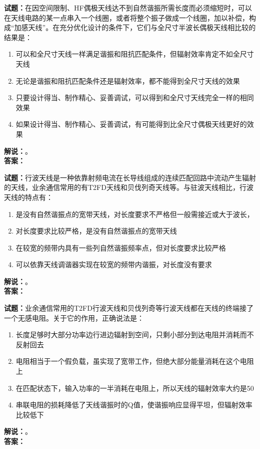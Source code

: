 \documentclass{ctexbook}
\begin{document}
\noindent\textbf{试题：}在因空间限制、HF偶极天线达不到自然谐振所需长度而必须缩短时，可以在天线电路的某一点串入一个线圈，或者将整个振子做成一个线圈，加以补偿，构成“加感天线”。在充分优化设计的条件下，它们与全尺寸半波长偶极天线相比较的结果是：
\begin{enumerate}[leftmargin=3em]
  \item 可以和全尺寸天线一样满足谐振和阻抗匹配条件，但辐射效率肯定不如全尺寸天线
  \item 无论是谐振和阻抗匹配条件还是辐射效率，都不能得到全尺寸天线的效果
  \item 只要设计得当、制作精心、妥善调试，可以得到和全尺寸天线完全一样的相同效果
  \item 如果设计得当、制作精心、妥善调试，有可能得到比全尺寸偶极天线更好的效果
\end{enumerate}
\noindent\textbf{解说：}\textbf{}。\\\noindent\textbf{答案：}

\bigskip

\noindent\textbf{试题：}行波天线是一种依靠射频电流在长导线组成的连续匹配回路中流动产生辐射的天线，业余通信常用的有T2FD天线和贝伐列奇天线等。与驻波天线相比，行波天线的特点有：
\begin{enumerate}[leftmargin=3em]
  \item 是没有自然谐振点的宽带天线，对长度要求不严格但一般需接近或大于波长，
  \item 对长度要求比较严格，是没有自然谐振点的宽带天线
  \item 在较宽的频带内具有一些列自然谐振频率点，但对长度要求比较严格
  \item 可以依靠天线调谐器实现在较宽的频带内谐振，对长度没有要求
\end{enumerate}
\noindent\textbf{解说：}\textbf{}。\\\noindent\textbf{答案：}

\bigskip

\noindent\textbf{试题：}业余通信常用的T2FD行波天线和贝伐列奇等行波天线都在天线的终端接了一个无感电阻。关于它的作用，正确说法是：
\begin{enumerate}[leftmargin=3em]
  \item 长度足够时大部分功率边行进边辐射到空间，只剩小部分到达电阻并消耗而不反射回去
  \item 电阻相当于一个假负载，虽实现了宽带工作，但绝大部分能量消耗在这个电阻上
  \item 在匹配状态下，输入功率的一半消耗在电阻上，所以天线的辐射效率大约是50%
  \item 串联电阻的损耗降低了天线谐振时的Q值，使谐振响应显得平坦，但辐射效率比较低下
\end{enumerate}
\noindent\textbf{解说：}\textbf{}。\\\noindent\textbf{答案：}
\end{document}
